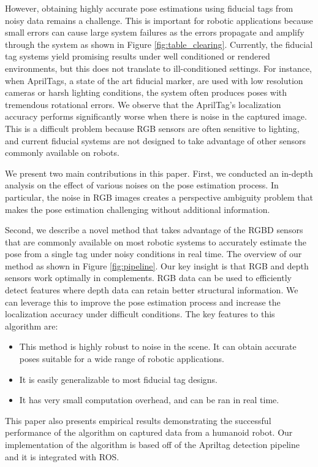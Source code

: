 However, obtaining highly accurate pose estimations using fiducial tags from noisy data remains a challenge. This is  important for robotic applications because small errors can cause large system failures as the errors propagate and amplify through the system as shown in Figure \ref{fig:table_clearing}. Currently, the fiducial tag systems yield promising results under well conditioned or rendered environments, but this does not translate to ill-conditioned settings. For instance, when AprilTags, a state of the art fiducial marker, are used with low resolution cameras or harsh lighting conditions, the system often produces poses with tremendous rotational errors. We observe that the AprilTag's localization accuracy performs significantly worse when there is noise in the captured image. This is a difficult problem because RGB sensors are often sensitive to lighting, and current fiducial systems are not designed to take advantage of other sensors commonly available on robots.

We present two main contributions in this paper. First, we conducted an in-depth analysis on the effect of various noises on the pose estimation process. In particular, the noise in RGB images creates a perspective ambiguity problem that makes the pose estimation challenging without additional information. 

Second, we describe a novel method that takes advantage of the RGBD sensors that are commonly available on most robotic systems to accurately estimate the pose from a single tag under noisy conditions in real time. The overview of our method as shown in Figure \ref{fig:pipeline}. Our key insight is that RGB and depth sensors work optimally in complements. RGB data can be used to efficiently detect features where depth data can retain better structural information. We can leverage this to improve the pose estimation process and increase the localization accuracy under difficult conditions. The key features to this algorithm are: 
\begin{itemize}
\item This method is highly robust to noise in the scene. It can obtain accurate poses suitable for a wide range of robotic applications.   
\item It is easily generalizable to most fiducial tag designs.
\item It has very small computation overhead, and can be ran in real time. 
\end{itemize}

This paper also presents empirical results demonstrating the successful performance of the algorithm on captured data from a humanoid robot. Our implementation of the algorithm is based off of the Apriltag detection pipeline and it is integrated with ROS. 